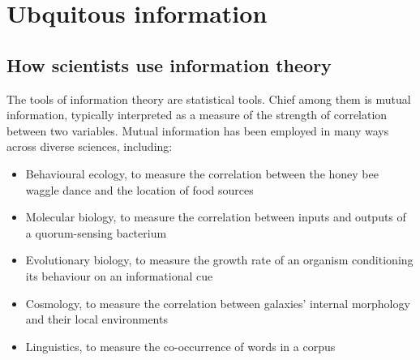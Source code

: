 \section{Ubquitous information}\label{sec:ubiquitous}

\subsection{How scientists use information theory}\label{subsec:scientists}

The tools of information theory are statistical tools.
Chief among them is mutual information, typically interpreted as a measure of the strength of correlation between two variables.
Mutual information has been employed in many ways across diverse sciences, including:

\begin{itemize}
    \item Behavioural ecology, to measure the correlation between the honey bee waggle dance and the location of food sources \citep{haldane1954statistical}
    \item Molecular biology, to measure the correlation between inputs and outputs of a quorum-sensing bacterium \citep{mehta2009information}
    \item Evolutionary biology, to measure the growth rate of an organism conditioning its behaviour on an informational cue \citep{donaldson-matasci2010fitness}
    \item Cosmology, to measure the correlation between galaxies' internal morphology and their local environments \citep{pandey2017how}
    \item Linguistics, to measure the co-occurrence of words in a corpus \citep[$\S$4]{hunston2002corpora}
\end{itemize}

